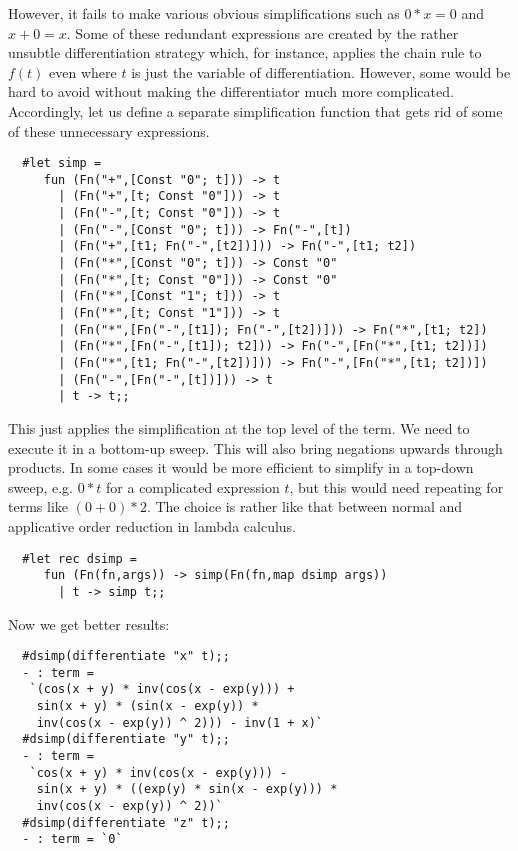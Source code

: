 However, it fails to make various obvious simplifications such as $0 * x = 0$
and $x + 0 = x$. Some of these redundant expressions are created by the rather
unsubtle differentiation strategy which, for instance, applies the chain rule
to $f(t)$ even where $t$ is just the variable of differentiation. However, some
would be hard to avoid without making the differentiator much more complicated.
Accordingly, let us define a separate simplification function that gets rid of
some of these unnecessary expressions.

\begin{boxed}\begin{verbatim}
  #let simp =
     fun (Fn("+",[Const "0"; t])) -> t
       | (Fn("+",[t; Const "0"])) -> t
       | (Fn("-",[t; Const "0"])) -> t
       | (Fn("-",[Const "0"; t])) -> Fn("-",[t])
       | (Fn("+",[t1; Fn("-",[t2])])) -> Fn("-",[t1; t2])
       | (Fn("*",[Const "0"; t])) -> Const "0"
       | (Fn("*",[t; Const "0"])) -> Const "0"
       | (Fn("*",[Const "1"; t])) -> t
       | (Fn("*",[t; Const "1"])) -> t
       | (Fn("*",[Fn("-",[t1]); Fn("-",[t2])])) -> Fn("*",[t1; t2])
       | (Fn("*",[Fn("-",[t1]); t2])) -> Fn("-",[Fn("*",[t1; t2])])
       | (Fn("*",[t1; Fn("-",[t2])])) -> Fn("-",[Fn("*",[t1; t2])])
       | (Fn("-",[Fn("-",[t])])) -> t
       | t -> t;;
\end{verbatim}\end{boxed}

This just applies the simplification at the top level of the term. We need to
execute it in a bottom-up sweep. This will also bring negations upwards through
products. In some cases it would be more efficient to simplify in a top-down
sweep, e.g. $0 * t$ for a complicated expression $t$, but this would need
repeating for terms like $(0 + 0) * 2$. The choice is rather like that between
normal and applicative order reduction in lambda calculus.

\begin{boxed}\begin{verbatim}
  #let rec dsimp =
     fun (Fn(fn,args)) -> simp(Fn(fn,map dsimp args))
       | t -> simp t;;
\end{verbatim}\end{boxed}

\noindent Now we get better results:

\begin{boxed}\begin{verbatim}
  #dsimp(differentiate "x" t);;
  - : term =
   `(cos(x + y) * inv(cos(x - exp(y))) +
    sin(x + y) * (sin(x - exp(y)) *
    inv(cos(x - exp(y)) ^ 2))) - inv(1 + x)`
  #dsimp(differentiate "y" t);;
  - : term =
   `cos(x + y) * inv(cos(x - exp(y))) -
    sin(x + y) * ((exp(y) * sin(x - exp(y))) *
    inv(cos(x - exp(y)) ^ 2))`
  #dsimp(differentiate "z" t);;
  - : term = `0`
\end{verbatim}\end{boxed}

